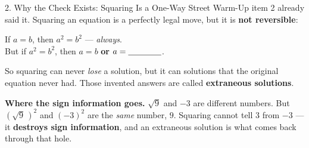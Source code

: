 \documentclass[10pt]{article}
\begin{document}
\begin{notesbox}{2. Why the Check Exists: Squaring Is a One-Way Street}
Warm-Up item 2 already said it. Squaring an equation is a perfectly legal move, but it is
\textbf{not reversible}:
\begin{center}
\begin{tcolorbox}[colback=forestbg, colframe=forest, boxrule=0.7pt, arc=1.5mm, width=0.94\linewidth,
    left=3mm, right=3mm, top=1.5mm, bottom=1.5mm]
\centering\small
If $a=b$, then $a^{2}=b^{2}$ --- \emph{always}. \\[3pt]
But if $a^{2}=b^{2}$, then $a=b$ \quad \textbf{or} \quad $a=\blank{1.4cm}$.
\end{tcolorbox}
\end{center}
So squaring can never \emph{lose} a solution, but it can \blank{2.6cm} solutions that the original
equation never had. Those invented answers are called \textbf{extraneous solutions}.

\vspace{3pt}
\textbf{Where the sign information goes.} $\sqrt{9}$ and $-3$ are different numbers. But
$\left(\sqrt{9}\,\right)^{2}$ and $(-3)^{2}$ are the \emph{same} number, $9$. Squaring cannot tell
$3$ from $-3$ --- it \textbf{destroys sign information}, and an extraneous solution is what comes
back through that hole.


\end{notesbox}
\end{document}
